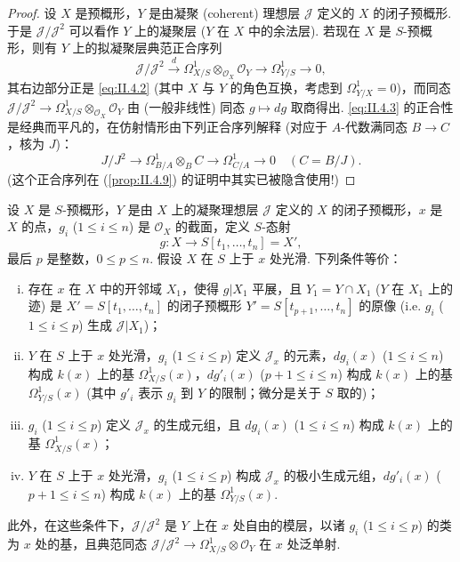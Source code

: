 \begin{proof}
设 $X$ 是预概形，$Y$ 是由凝聚 (coherent) 理想层 $\mathcal{J}$ 定义的 $X$ 的闭子预概形. 于是 $\mathcal{J}/\mathcal{J}^2$ 可以看作 $Y$ 上的凝聚层 ($Y$ 在 $X$ 中的余法层). 若现在 $X$ 是 $S$-预概形，则有 $Y$ 上的拟凝聚层典范正合序列
\begin{equation}
\mathcal{J}/\mathcal{J}^2 \xrightarrow{d} \varOmega_{X/S}^{1} \otimes_{\mathcal{O}_X} \mathcal{O}_Y \longrightarrow \varOmega_{Y/S}^{1} \longrightarrow 0, \tag{4.3}
\label{eq:II.4.3}
\end{equation}
其右边部分正是 \eqref{eq:II.4.2} (其中 $X$ 与 $Y$ 的角色互换，考虑到 $\varOmega_{Y/X}^{1} = 0$)，而同态 $\mathcal{J}/\mathcal{J}^2 \to \varOmega_{X/S}^{1} \otimes_{\mathcal{O}_X} \mathcal{O}_Y$ 由 (一般非线性) 同态 $g \mapsto dg$ 取商得出. \eqref{eq:II.4.3} 的正合性是经典而平凡的，在仿射情形由下列正合序列解释 (对应于 $A$-代数满同态 $B \to C$，核为 $J$)：
\begin{equation}
J/J^2 \longrightarrow \varOmega_{B/A}^{1} \otimes_B C \longrightarrow \varOmega_{C/A}^{1} \longrightarrow 0 \quad (C = B/J). \tag{4.3bis}
\label{eq:II.4.3bis}
\end{equation}
(这个正合序列在 (\ref{prop:II.4.9}) 的证明中其实已被隐含使用!)
\end{proof}

\begin{proposition}\label{prop:II.4.9}
设 $X$ 是 $S$-预概形，$Y$ 是由 $X$ 上的凝聚理想层 $\mathcal{J}$ 定义的 $X$ 的闭子预概形，$x$ 是 $X$ 的点，$g_i$ ($1 \leqslant i \leqslant n$) 是 $\mathcal{O}_X$ 的截面，定义 $S$-态射
\[
g \colon X \longrightarrow S[t_1, \dots, t_n] = X',
\]
最后 $p$ 是整数，$0 \leqslant p \leqslant n$. 假设 $X$ 在 $S$ 上于 $x$ 处光滑. 下列条件等价：
\begin{enumerate}[(i)]
\item 存在 $x$ 在 $X$ 中的开邻域 $X_1$，使得 $g|X_1$ 平展，且 $Y_1 = Y \cap X_1$ ($Y$ 在 $X_1$ 上的迹) 是 $X' = S[t_1, \dots, t_n]$ 的闭子预概形 $Y' = S[t_{p+1}, \dots, t_n]$ 的原像 (i.e. $g_i$ ($1 \leqslant i \leqslant p$) 生成 $\mathcal{J}|X_1$)；
\item $Y$ 在 $S$ 上于 $x$ 处光滑，$g_i$ ($1 \leqslant i \leqslant p$) 定义 $\mathcal{J}_x$ 的元素，$dg_i(x)$ ($1 \leqslant i \leqslant n$) 构成 $k(x)$ 上的基 $\varOmega_{X/S}^{1}(x)$，$dg'_i(x)$ ($p+1 \leqslant i \leqslant n$) 构成 $k(x)$ 上的基 $\varOmega_{Y/S}^{1}(x)$ (其中 $g'_i$ 表示 $g_i$ 到 $Y$ 的限制；微分是关于 $S$ 取的)；
\item $g_i$ ($1 \leqslant i \leqslant p$) 定义 $\mathcal{J}_x$ 的生成元组，且 $dg_i(x)$ ($1 \leqslant i \leqslant n$) 构成 $k(x)$ 上的基 $\varOmega_{X/S}^{1}(x)$；
\item $Y$ 在 $S$ 上于 $x$ 处光滑，$g_i$ ($1 \leqslant i \leqslant p$) 构成 $\mathcal{J}_x$ 的极小生成元组，$dg'_i(x)$ ($p+1 \leqslant i \leqslant n$) 构成 $k(x)$ 上的基 $\varOmega_{Y/S}^{1}(x)$.
\end{enumerate}
此外，在这些条件下，$\mathcal{J}/\mathcal{J}^2$ 是 $Y$ 上在 $x$ 处自由的模层，以诸 $g_i$ ($1 \leqslant i \leqslant p$) 的类为 $x$ 处的基，且典范同态 $\mathcal{J}/\mathcal{J}^2 \to \varOmega_{X/S}^{1} \otimes \mathcal{O}_Y$ 在 $x$ 处泛单射.
\end{proposition}

